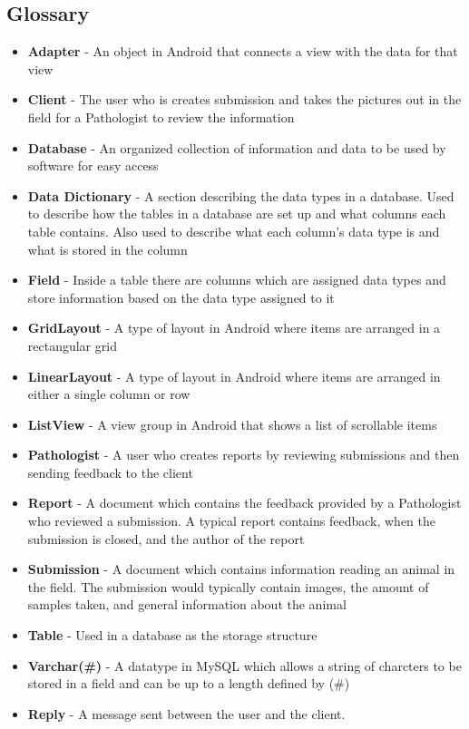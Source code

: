 \documentclass[onecolumn, draftclsnofoot,10pt, compsoc]{IEEEtran}
\begin{document}
\subsection{Glossary}
\begin{itemize}
\item \textbf{Adapter} - An object in Android that connects a view with the data for that view
\item \textbf{Client} - The user who is creates submission and takes the pictures out in the field for a Pathologist to review the information
\item \textbf{Database} - An organized collection of information and data to be used by software for easy access
\item \textbf{Data Dictionary} - A section describing the data types in a database. Used to describe how the tables in a database are set up and what columns each table contains. Also used to describe what each column's data type is and what is stored in the column
\item \textbf{Field} - Inside a table there are columns which are assigned data types and store information based on the data type assigned to it 
\item \textbf{GridLayout} - A type of layout in Android where items are arranged in a rectangular grid
\item \textbf{LinearLayout} - A type of layout in Android where items are arranged in either a single column or row
\item \textbf{ListView} - A view group in Android that shows a list of scrollable items
\item \textbf{Pathologist} - A user who creates reports by reviewing submissions and then sending feedback to the client
\item \textbf{Report} - A document which contains the feedback provided by a Pathologist who reviewed a submission. A typical report contains feedback, when the submission is closed, and the author of the report
\item \textbf{Submission} - A document which contains information reading an animal in the field. The submission would typically contain images, the amount of samples taken, and general information about the animal
\item \textbf{Table} - Used in a database as the storage structure
\item \textbf{Varchar(\#)} - A datatype in MySQL which allows a string of charcters to be stored in a field and can be up to a length defined by (\#)
\item \textbf{Reply} - A message sent between the user and the client. 
\end{itemize}
\end{document}
